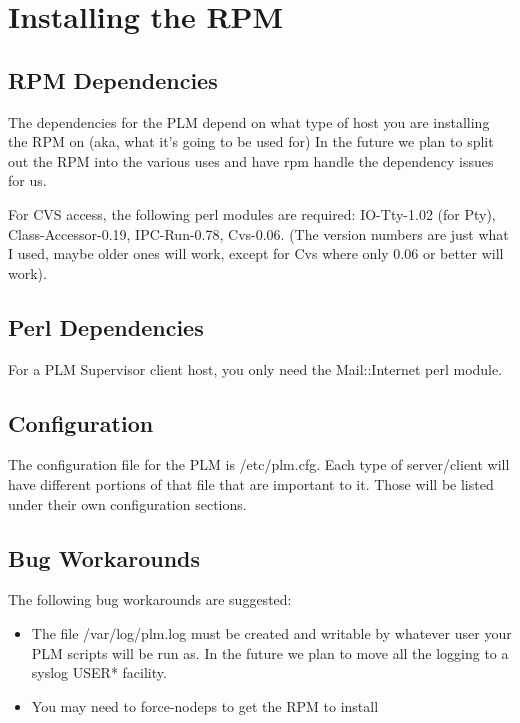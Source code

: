 \section {Installing the RPM}

\subsection{RPM Dependencies}
The dependencies for the PLM depend on what type of host you are installing the RPM on (aka, what it's going to be used for)
In the future we plan to split out the RPM into the various uses and have rpm handle the dependency issues for us.

For CVS access, the following perl modules are required:  IO-Tty-1.02 (for Pty), Class-Accessor-0.19, IPC-Run-0.78, Cvs-0.06.  (The version numbers are just what I used, maybe older ones will work, except for Cvs where only 0.06 or better will work).


\subsection{Perl Dependencies}
For a PLM Supervisor client host, you only need the Mail::Internet perl module.

\subsection{Configuration}
The configuration file for the PLM is /etc/plm.cfg.  Each type of server/client will have different portions of that file that are important to it.  Those will be listed under their own configuration sections.

\subsection{Bug Workarounds}
The following bug workarounds are suggested:

\begin{itemize}
\item The file /var/log/plm.log must be created and writable by whatever user your PLM scripts will be run as.  In the future we plan to move all the logging to a syslog USER* facility.
\item You may need to force-nodeps to get the RPM to install
\end{itemize}
